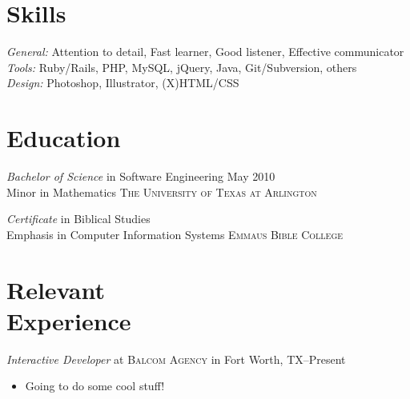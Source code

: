 \documentclass[margin]{res}
\begin{document}
\begin{resume}

\section{\textsf{Skills}}

                \textit{General:} Attention to detail, Fast learner, Good listener, Effective communicator  \\
                \textit{Tools:} Ruby/Rails, PHP, MySQL, jQuery, Java, Git/Subversion, others                \\
                \textit{Design:} Photoshop, Illustrator, (X)HTML/CSS                                       %

\vspace{10pt}

\section{\textsf{Education}}

                \textit{Bachelor of Science} in Software Engineering \dotfill May 2010   \\
								Minor in Mathematics \hfill  \textsc{The University of Texas at Arlington}                                                                
								                
                \textit{Certificate} in Biblical Studies   \\
                Emphasis in Computer Information Systems \hfill  \textsc{Emmaus Bible College}                    

\vspace{10pt}


\section{\textsf{Relevant \\ Experience}} 

                \textit{Interactive Developer}
				 at \textsc{Balcom Agency} in Fort Worth, TX--Present
				 \vspace{-10pt}\begin{itemize} \itemsep -2pt %
				 	\item Going to do some cool stuff!
				 \end{itemize}


\end{resume}
\end{document}
